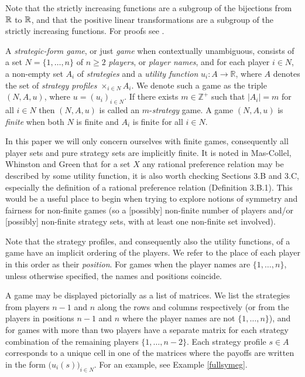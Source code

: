 	Note that the strictly increasing functions are a subgroup of the bijections from $\mathbb{R}$ to $\mathbb{R}$, and that the positive linear transformations are a subgroup of the strictly increasing functions. For proofs see \cite[Propositions 2.2.4 and 2.2.6]{ham2011honoursthesis}.
	
	A \textit{strategic-form game}, or just \textit{game} when contextually unambiguous, consists of a set $N = \{1, \ldots, n\}$ of $n \geq 2$ \textit{players}, or \textit{player names}, and for each player $i \in N$, a non-empty set $A_i$ of \textit{strategies} and a \textit{utility function} $u_i:A\rightarrow\mathbb{R}$, where $A$ denotes the set of \textit{strategy profiles} $\times_{i \in N}A_i$. We denote such a game as the triple $(N, A, u)$, where $u = (u_i)_{i \in N}$. If there exists $m \in \mathbb{Z}^+$ such that $|A_i| = m$ for all $i \in N$ then $(N, A, u)$ is called an $m$-\textit{strategy} game. A game $(N, A, u)$ is \textit{finite} when both $N$ is finite and $A_i$ is finite for all $i \in N$. 
	
	In this paper we will only concern ourselves with finite games, consequently all player sets and pure strategy sets are implicitly finite. It is noted in Mas-Collel, Whinston and Green \cite[Proposition 3.C.1]{Mas1995microeconomic} that for a set $X$ any rational preference relation may be described by some utility function, it is also worth checking Sections 3.B and 3.C, especially the definition of a rational preference relation (Definition 3.B.1). This would be a useful place to begin when trying to explore notions of symmetry and fairness for non-finite games (so a [possibly] non-finite number of players and/or [possibly] non-finite strategy sets, with at least one non-finite set involved). %
	
	Note that the strategy profiles, and consequently also the utility functions, of a game have an implicit ordering of the players. We refer to the place of each player in this order as their \textit{position}. For games when the player names are $\{1, \ldots, n\}$, unless otherwise specified, the names and positions coincide.
	
	A game may be displayed pictorially as a list of matrices. We list the strategies from players $n-1$ and $n$ along the rows and columns respectively (or from the players in positions $n-1$ and $n$ where the player names are not $\{1, \ldots, n\}$), and for games with more than two players have a separate matrix for each strategy combination of the remaining players $\{1, \ldots, n-2\}$. Each strategy profile $s \in A$ corresponds to a unique cell in one of the matrices where the payoffs are written in the form $\bigl(u_i(s)\bigr)_{i \in N}$. For an example, see Example \ref{fullsymeg}.
	
